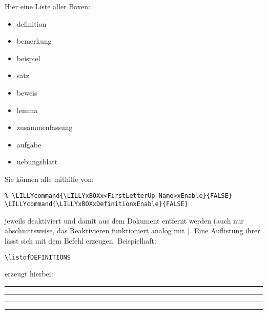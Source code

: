 Hier eine Liste aller Boxen:
\begin{multicols}{3}
    \begin{itemize}[label=$\diamond$]\narrowitems
        \item definition
        \item bemerkung
        \item beispiel
        \item satz
        \item beweis
        \item lemma
        \item zusammenfassung
        \item aufgabe
        \item uebungsblatt
    \end{itemize}
\end{multicols}
Sie können alle mithilfe von:
\begin{lstlisting}[style=latex]
%% Allgemein
% \LILLYcommand{\LILLYxBOXx<FirstLetterUp-Name>xEnable}{FALSE}
\LILLYcommand{\LILLYxBOXxDefinitionxEnable}{FALSE}
\end{lstlisting}
jeweils deaktiviert und damit aus dem Dokument entfernt werden (auch nur abschnittsweise, das Reaktivieren funktioniert analog mit ). \newline
Eine Auflistung ihrer lässt sich mit dem  Befehl erzeugen. Beispielhaft:
\begin{lstlisting}[style=latex]
\listofDEFINITIONS
\end{lstlisting}
erzeugt hierbei:\\
\rule{\linewidth}{1.2pt}\vspace{-0.75\baselineskip}
\rule{\linewidth}{0.6pt}\vspace*{-1.5cm}
\listofDEFINITIONS    
\rule{\linewidth}{0.6pt}\vspace{-0.7\baselineskip}
\rule{\linewidth}{1.2pt}

\clearpage
\newcommand{\printmark}[2][Linkname]{\ensuremath{\text{#1}^{\rightarrow~\text{\pageref{#2}}}}}

